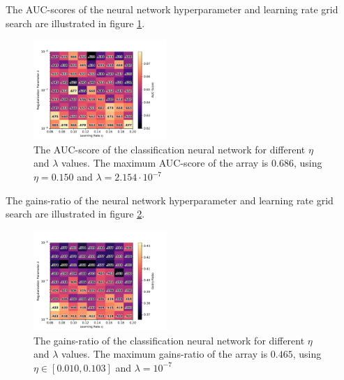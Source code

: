 		The AUC-scores of the neural network hyperparameter and learning rate grid search are illustrated in figure \ref{fig:cc_auc}.
		\begin{figure}[H]
			\centering
			\includegraphics[width=0.45\textwidth]{figures/cc_res_2.pdf}
			\caption{The AUC-score of the classification neural network for different $\eta$ and $\lambda$ values. The maximum AUC-score of the array is $0.686$, using $\eta=0.150$ and $\lambda=2.154\cdot 10^{-7}$}
			\label{fig:cc_auc}
		\end{figure}
		The gains-ratio of the neural network hyperparameter and learning rate grid search are illustrated in figure \ref{fig:cc_gr}.
		\begin{figure}[H]
			\centering
			\includegraphics[width=0.45\textwidth]{figures/cc_res_3.pdf}
			\caption{The gains-ratio of the classification neural network for different $\eta$ and $\lambda$ values. The maximum gains-ratio of the array is $0.465$, using $\eta \in [0.010, 0.103]$ and $\lambda=10^{-7}$}
			\label{fig:cc_gr}
		\end{figure}
